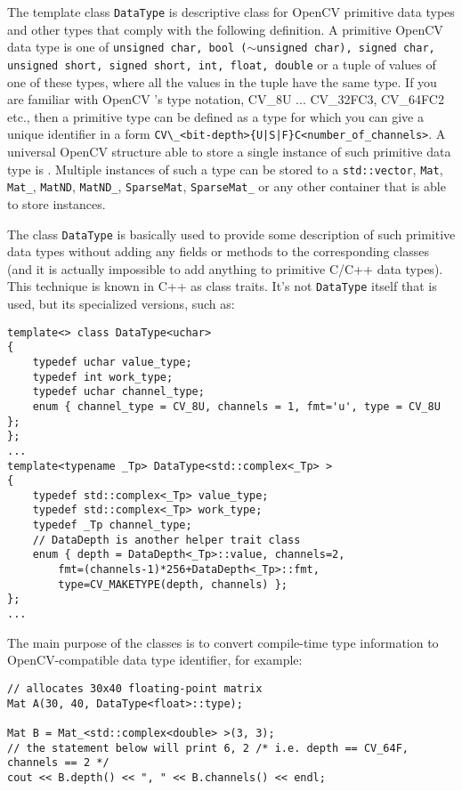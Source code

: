 The template class \texttt{DataType} is descriptive class for OpenCV primitive data types and other types that comply with the following definition. A primitive OpenCV data type is one of \texttt{unsigned char, bool ($\sim$unsigned char), signed char, unsigned short, signed short, int, float, double} or a tuple of values of one of these types, where all the values in the tuple have the same type. If you are familiar with OpenCV 's type notation, CV\_8U ... CV\_32FC3, CV\_64FC2 etc., then a primitive type can be defined as a type for which you can give a unique identifier in a form \verb*"CV\_<bit-depth>{U|S|F}C<number_of_channels>". A universal OpenCV structure able to store a single instance of such primitive data type is . Multiple instances of such a type can be stored to a \texttt{std::vector}, \texttt{Mat}, \texttt{Mat\_}, \texttt{MatND}, \texttt{MatND\_}, \texttt{SparseMat}, \texttt{SparseMat\_} or any other container that is able to store  instances.
 
The class \texttt{DataType} is basically used to provide some description of such primitive data types without adding any fields or methods to the corresponding classes (and it is actually impossible to add anything to primitive C/C++ data types). This technique is known in C++ as class traits. It's not \texttt{DataType} itself that is used, but its specialized versions, such as:

\begin{lstlisting}
template<> class DataType<uchar>
{
    typedef uchar value_type;
    typedef int work_type;
    typedef uchar channel_type;
    enum { channel_type = CV_8U, channels = 1, fmt='u', type = CV_8U };
};
...
template<typename _Tp> DataType<std::complex<_Tp> >
{
    typedef std::complex<_Tp> value_type;
    typedef std::complex<_Tp> work_type;
    typedef _Tp channel_type;
    // DataDepth is another helper trait class
    enum { depth = DataDepth<_Tp>::value, channels=2,
        fmt=(channels-1)*256+DataDepth<_Tp>::fmt,
        type=CV_MAKETYPE(depth, channels) };
};
...
\end{lstlisting}

The main purpose of the classes is to convert compile-time type information to OpenCV-compatible data type identifier, for example:

\begin{lstlisting}
// allocates 30x40 floating-point matrix
Mat A(30, 40, DataType<float>::type);

Mat B = Mat_<std::complex<double> >(3, 3);
// the statement below will print 6, 2 /* i.e. depth == CV_64F, channels == 2 */ 
cout << B.depth() << ", " << B.channels() << endl; 
\end{lstlisting}

